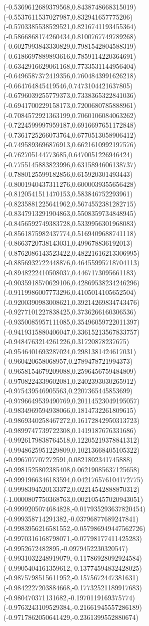 {(-0.5369612689379568,0.8438748668315019)
(-0.5537611537027987,0.832941657775206)
(-0.5703385538529521,0.8216741193455364)
(-0.5866868174260434,0.8100767749789268)
(-0.6027993843330829,0.7981542804588319)
(-0.6186697889893616,0.7859114220364691)
(-0.6342916629061168,0.7733531144956404)
(-0.6496587372419356,0.7604843991626218)
(-0.664764845419546,0.7473104421637805)
(-0.6796039255779373,0.7338365322841036)
(-0.6941700229158173,0.7200680785888961)
(-0.7084572921363199,0.7060106084063262)
(-0.7224599997959187,0.6916697651172848)
(-0.7361725266073764,0.6770513058906412)
(-0.7495893696876913,0.6621610992197576)
(-0.762705144773685,0.6470051226946424)
(-0.7755145883823996,0.6315894606138737)
(-0.7880125599182856,0.615920301493443)
(-0.8001940437311276,0.6000039355656428)
(-0.8120541511470153,0.583846752293961)
(-0.8235881225641962,0.5674552381282715)
(-0.8347913291904863,0.5508359734848945)
(-0.8456592749383728,0.5339956301968083)
(-0.8561875982437774,0.5169409688741118)
(-0.8663720738143031,0.499678836192013)
(-0.8762086143523422,0.48221616213306995)
(-0.8856932722448876,0.46455995718704113)
(-0.8948222410508037,0.4467173095661183)
(-0.9035918570629106,0.42869538234246296)
(-0.9119986007773296,0.4105014105652504)
(-0.9200390983008621,0.39214269834743476)
(-0.9277101227838425,0.3736266160306536)
(-0.9350085957111085,0.35496059722011397)
(-0.9419315880406047,0.33615213567833757)
(-0.9484763214261226,0.31720878237675)
(-0.9546401693287024,0.2981381424617031)
(-0.960420658068957,0.2789478721994373)
(-0.9658154679209088,0.2596456759484809)
(-0.9708224339602081,0.2402393030265912)
(-0.975439546905563,0.2207365445853699)
(-0.9796649539490769,0.20114523049195057)
(-0.9834969594938066,0.1814732261809615)
(-0.9869340258467272,0.16172842950313723)
(-0.9899747739722308,0.1419187676331686)
(-0.9926179838764518,0.12205219378841312)
(-0.9948625951229809,0.10213668405105322)
(-0.996707707272591,0.0821802341745888)
(-0.9981525802385408,0.06219085637125658)
(-0.9991966346183594,0.042176576104172775)
(-0.9998394520133372,0.02214542888870312)
(-1.0000807750368763,0.002105457020943051)
(-0.9999205074684828,-0.017935293637820454)
(-0.999358714291382,-0.03796877689247841)
(-0.9983956216581552,-0.057986949447562726)
(-0.9970316168798071,-0.07798177411425283)
(-0.9952672482895,-0.0979452230320547)
(-0.9931032248919079,-0.11786928092924584)
(-0.9905404161359612,-0.13774594832428025)
(-0.9875798515611952,-0.1575672447381631)
(-0.9842227203884668,-0.17732521189917683)
(-0.980470371131682,-0.1970119169375774)
(-0.9763243109529384,-0.21661945557286189)
(-0.9717862050641429,-0.2361399552880674)
}
